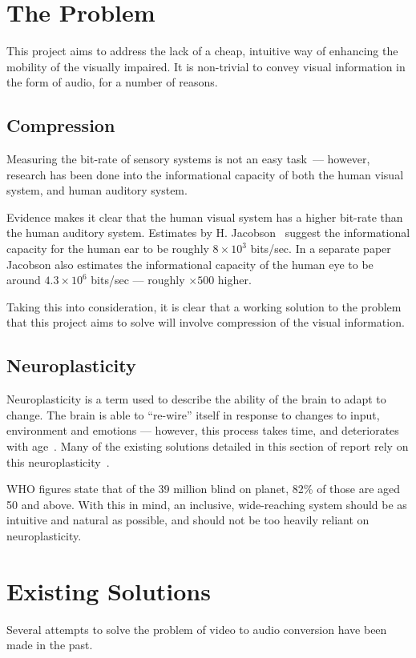 \section{The Problem}
This project aims to address the lack of a cheap, intuitive way of enhancing the mobility of the visually impaired. It is non-trivial to convey visual information in the form of audio, for a number of reasons.

\subsection{Compression}
\label{sec:compression}
Measuring the bit-rate of sensory systems is not an easy task~--- however, research has been done into the informational capacity of both the human visual system, and human auditory system.

Evidence makes it clear that the human visual system has a higher bit-rate than the human auditory system. Estimates by H. Jacobson~\cite{jacobson1950informational} suggest the informational capacity for the human ear to be roughly $8\times10^3$ bits/sec. In a separate paper~\cite{jacobson1951informational} Jacobson also estimates the informational capacity of the human eye to be around $4.3\times10^6$ bits/sec --- roughly $\times500$ higher. 

Taking this into consideration, it is clear that a working solution to the problem that this project aims to solve will involve compression of the visual information. 

\subsection{Neuroplasticity}
Neuroplasticity is a term used to describe the ability of the brain to adapt to change. The brain is able to ``re-wire'' itself in response to changes to input, environment and emotions --- however, this process takes time, and deteriorates with age~\cite{park2013aging}. Many of the existing solutions detailed in this section of report rely on this neuroplasticity~\cite{striem2013neuroplasticity}.

\ac{WHO} figures state that of the 39 million blind on planet, 82\% of those are aged 50 and above. With this in mind, an inclusive, wide-reaching system should be as intuitive and natural as possible, and should not be too heavily reliant on neuroplasticity.

\section{Existing Solutions}
\label{sec:existing}
Several attempts to solve the problem of video to audio conversion have been made in the past.

